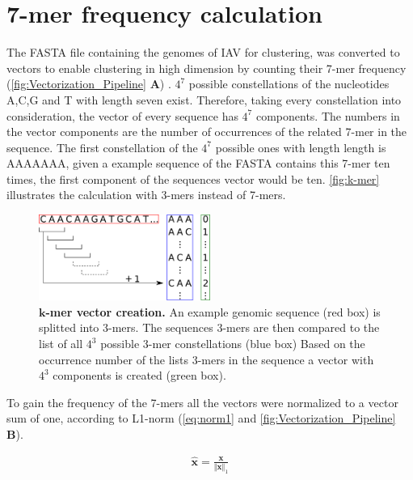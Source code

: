 \section{7-mer frequency calculation} \label{sec:Frequency}

The FASTA file containing the genomes of \gls{IAV} for clustering, was converted to vectors to enable clustering in high dimension by counting their 7-mer frequency (\autoref{fig:Vectorization_Pipeline} \textsf{\textbf{A}}) \autocite{edgar_muscle_2004}. $4^7$ possible constellations of the nucleotides A,C,G and T with length seven exist. Therefore, taking every constellation into consideration, the vector of every sequence has $4^7$ components. The numbers in the vector components are the number of occurrences of the related 7-mer in the sequence. The first constellation of the $4^7$ possible ones with length length is AAAAAAA, given a example sequence of the FASTA contains this 7-mer ten times, the first component of the sequences vector would be ten. \autoref{fig:k-mer} illustrates the calculation with 3-mers instead of 7-mers.

\begin{figure}[!hbt]
    \centering
    \includegraphics[width=0.5\textwidth]{Graphics/Kmer.pdf}
    \caption[$k$-mer vector creation]{\textbf{$\bm{k}$-mer vector creation.} An example genomic sequence (red box) is splitted into 3-mers. The sequences 3-mers are then compared to the list of all $4^3$ possible 3-mer constellations (blue box) Based on the occurrence number of the lists 3-mers in the sequence a vector with $4^3$ components is created (green box).}
    \label{fig:k-mer}
\end{figure}

To gain the frequency of the 7-mers all the vectors were normalized to a vector sum of one, according to L1-norm (\autoref{eq:norm1} and \autoref{fig:Vectorization_Pipeline} \textsf{\textbf{B}}). 

\begin{equation}\label{eq:norm1}
    \begin{aligned}
        \mathbf{\hat{x}} = \frac{\mathbf{x}}{\Vert\mathbf{x}\Vert_1}
    \end{aligned}
\end{equation}


